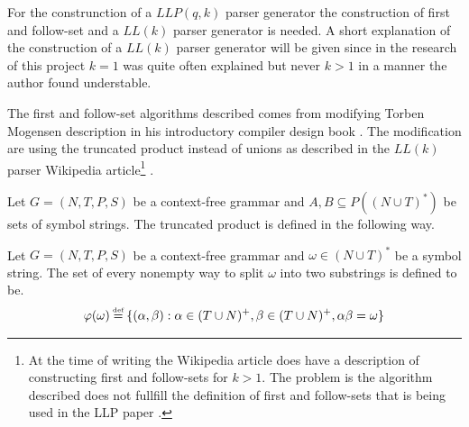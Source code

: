 For the construnction of a $LLP(q,k)$ parser generator the construction of first and follow-set \cite[p. 5]{Vagner2007} and a $LL(k)$ parser generator is needed. A short explanation of the construction of a $LL(k)$ parser generator will be given since in the research of this project $k = 1$ was quite often explained but never $k > 1$ in a manner the author found understable.

The first and follow-set algorithms described comes from modifying Torben Mogensen description in his introductory compiler design book \cite[p. 55-65]{Mogensen}. The modification are using the truncated product instead of unions as described in the $LL(k)$ parser Wikipedia article\footnote{At the time of writing the Wikipedia article does have a description of constructing first and follow-sets for $k > 1$. The problem is the algorithm described does not fullfill the definition of first and follow-sets that is being used in the LLP paper \cite[p. 5]{Vagner2007}.} \cite{wiki:LL_parser}.

\begin{definition}
    Let $G = (N, T, P, S)$ be a context-free grammar and $A, B \subseteq P((N \cup T)^*)$ be sets of symbol strings. The truncated product is defined in the following way.
\end{definition}

\begin{definition}
    Let $G = (N, T, P, S)$ be a context-free grammar and $\omega \in (N \cup T)^*$ be a symbol string. The set of every nonempty way to split $\omega$ into two substrings is defined to be.
    \begin{gather*}
        \varphi(\omega) \defeq \{(\alpha, \beta) : \alpha \in (T \cup N)^+, \beta \in (T \cup N)^+, \alpha\beta = \omega\}
    \end{gather*}
\end{definition}

